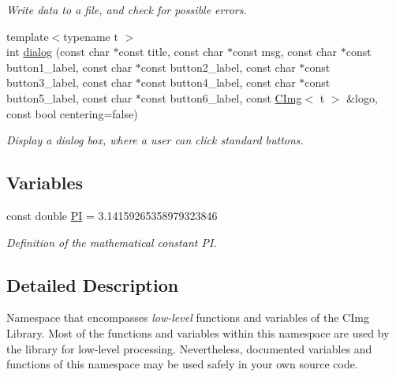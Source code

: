 \begin{DoxyCompactItemize}
\begin{DoxyCompactList}\small\item\em Write data to a file, and check for possible errors. \item\end{DoxyCompactList}\item 
{\footnotesize template$<$typename t $>$ }\\int \hyperlink{namespacecimg__library_1_1cimg_a9314d63e17bc5e4646cbe5fd09dbcd9f}{dialog} (const char $\ast$const title, const char $\ast$const msg, const char $\ast$const button1\_\-label, const char $\ast$const button2\_\-label, const char $\ast$const button3\_\-label, const char $\ast$const button4\_\-label, const char $\ast$const button5\_\-label, const char $\ast$const button6\_\-label, const \hyperlink{structcimg__library_1_1CImg}{CImg}$<$ t $>$ \&logo, const bool centering=false)
\begin{DoxyCompactList}\small\item\em Display a dialog box, where a user can click standard buttons. \item\end{DoxyCompactList}\end{DoxyCompactItemize}
\subsection*{Variables}
\begin{DoxyCompactItemize}
\item 
\hypertarget{namespacecimg__library_1_1cimg_a952eac791b596a61bba0a133a3bb439f}{
const double \hyperlink{namespacecimg__library_1_1cimg_a952eac791b596a61bba0a133a3bb439f}{PI} = 3.14159265358979323846}
\label{namespacecimg__library_1_1cimg_a952eac791b596a61bba0a133a3bb439f}

\begin{DoxyCompactList}\small\item\em Definition of the mathematical constant PI. \item\end{DoxyCompactList}\end{DoxyCompactItemize}


\subsection{Detailed Description}
Namespace that encompasses {\itshape low-\/level\/} functions and variables of the CImg Library. Most of the functions and variables within this namespace are used by the library for low-\/level processing. Nevertheless, documented variables and functions of this namespace may be used safely in your own source code.

